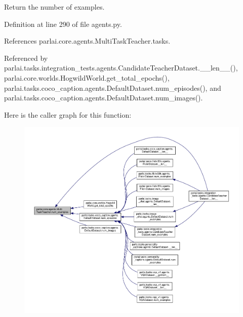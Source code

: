 \begin{DoxyVerb}Return the number of examples.\end{DoxyVerb}
 

Definition at line 290 of file agents.\+py.



References parlai.\+core.\+agents.\+Multi\+Task\+Teacher.\+tasks.



Referenced by parlai.\+tasks.\+integration\+\_\+tests.\+agents.\+Candidate\+Teacher\+Dataset.\+\_\+\+\_\+len\+\_\+\+\_\+(), parlai.\+core.\+worlds.\+Hogwild\+World.\+get\+\_\+total\+\_\+epochs(), parlai.\+tasks.\+coco\+\_\+caption.\+agents.\+Default\+Dataset.\+num\+\_\+episodes(), and parlai.\+tasks.\+coco\+\_\+caption.\+agents.\+Default\+Dataset.\+num\+\_\+images().

Here is the caller graph for this function\+:
\nopagebreak
\begin{figure}[H]
\begin{center}
\leavevmode
\includegraphics[width=350pt]{classparlai_1_1core_1_1agents_1_1MultiTaskTeacher_a21fa6d0565bd35e54a74806ecca62e34_icgraph}
\end{center}
\end{figure}
\mbox{\label{classparlai_1_1core_1_1agents_1_1MultiTaskTeacher_a42290221cabd0f1ca21cb87a2228af10}} 
